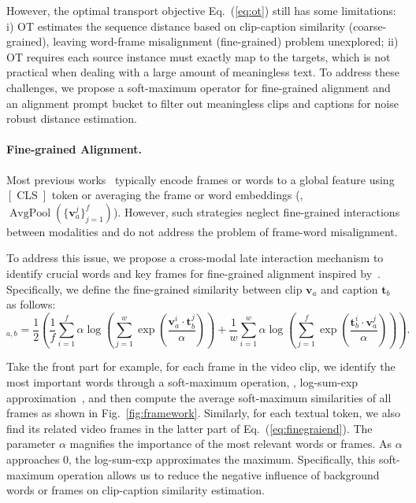  

However, the optimal transport objective Eq.~(\ref{eq:ot}) still has some limitations: i) OT estimates the sequence distance based on clip-caption similarity (coarse-grained), leaving word-frame misalignment (fine-grained) problem unexplored; ii) OT requires each source instance must exactly map to the targets, which is not practical when dealing with a large amount of meaningless text. To address these challenges, we propose a soft-maximum operator for fine-grained alignment and an alignment prompt bucket to filter out meaningless clips and captions for noise robust distance estimation.

\paragraph{Fine-grained Alignment.}
Most previous works~\citep{videoclip,tempclr,tan} typically encode frames or words to a global feature using $[\operatorname{CLS}]$ token or averaging the frame or word embeddings (\eg, $\operatorname{AvgPool}(\{\mathbf{v}_a^j\}_{j=1}^f)$). However, such strategies neglect fine-grained interactions between modalities and do not address the problem of frame-word misalignment.

To address this issue, we propose a cross-modal late interaction mechanism to identify crucial words and key frames for fine-grained alignment inspired by~\cite{yao2021filip,wang2022disentangled}. Specifically, we define the fine-grained similarity between clip $\mathbf{v}_a$ and caption $\mathbf{t}_b$ as follows:
\begin{equation}
[\mathbf{S}]_{a,b}=\frac{1}{2} \left(\frac{1}{f}\sum_{i=1}^{f}\alpha \log  \left(\sum_{j=1}^w \exp (\frac{\mathbf{v}_a^i\cdot \mathbf{t}_b^j}{\alpha})\right) + \frac{1}{w}\sum_{i=1}^{w}\alpha \log  \left(\sum_{j=1}^f \exp (\frac{\mathbf{t}_b^i\cdot \mathbf{v}_a^j}{\alpha})\right)\right).
\label{eq:finegraiend}
\end{equation}

Take the front part for example, for each frame in the video clip, we identify the most important words through a soft-maximum operation, \ie, log-sum-exp approximation~\citep{beck2012smoothing}, and then compute the average soft-maximum similarities of all frames as shown in Fig.~\ref{fig:framework}. Similarly, for each textual token, we also find its related video frames in the latter part of Eq.~(\ref{eq:finegraiend}). The parameter $\alpha$ magnifies the importance of the most relevant words or frames. As $\alpha$ approaches 0, the log-sum-exp approximates the maximum. Specifically, this soft-maximum operation allows us to reduce the negative influence of background words or frames on clip-caption similarity estimation.

